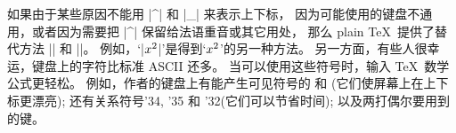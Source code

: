 \danger 如果由于某些原因不能用 |^| 和 |_| 来表示上下标，
因为可能使用的键盘不通用，或者因为需要把 |^| 保留给法语重音或其它用处，
那么 plain \TeX\ 提供了替代方法 |\sp| 和 |\sb|。%
例如，`|$x\sp2$|'是得到`$x\sp2$'的另一种方法。%
另一方面，有些人很幸运，键盘上的字符比标准 ASCII 还多。%
当可以使用这些符号时，输入 \TeX\ 数学公式更轻松。%
例如，作者的键盘上有能产生可见符号的 \up 和 \dn(它们使屏幕上在上下标更漂亮);
还有关系符号{\tentex\char'34},
{\tentex\char'35} 和 {\tentex\char'32}(它们可以节省时间);
以及两打偶尔要用到的键。

